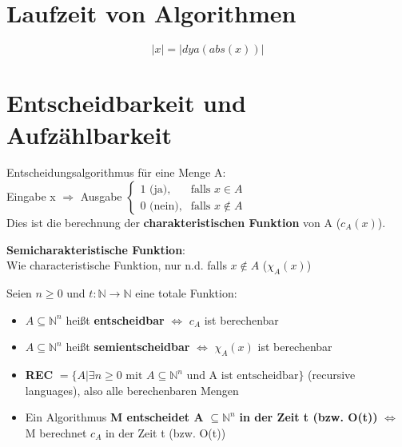 \documentclass[14pt]{article}
\begin{document}
\section{Laufzeit von Algorithmen}
\begin{definition}
    \[
        |x| = |dya(abs(x))|
    \]
\end{definition}

\section{Entscheidbarkeit und Aufzählbarkeit}
\begin{definition}[Entscheidungsalgorithmus]
    Entscheidungsalgorithmus für eine Menge A: \\
    \indent Eingabe x $\Rightarrow$ Ausgabe
    $ 
    \begin{cases}
        1 \text{ (ja),} & \text{falls } x \in A \\
        0 \text{ (nein),} & \text{falls } x \notin A
      \end{cases}   
    $ \\
    Dies ist die berechnung der \textbf{charakteristischen Funktion}
    von A ($c_A(x)$).
\end{definition}
\textbf{Semicharakteristische Funktion}: \\
Wie characteristische Funktion, nur n.d. falls $x \notin A$ ($\chi_A(x)$)
\begin{definition}[Entscheidbarkeit]
    Seien $n \geq 0$ und $t: \mathbb{N} \rightarrow \mathbb{N}$ eine 
    totale Funktion:
    \begin{itemize}
        \item $A \subseteq \mathbb{N}^n$ heißt \textbf{entscheidbar}
        $\Leftrightarrow$ $c_A$ ist berechenbar
        \item $A \subseteq \mathbb{N}^n$ heißt \textbf{semientscheidbar}
        $\Leftrightarrow$ $\chi_A(x)$ ist berechenbar
        \item \textbf{REC} $= \{ A | \exists n\geq 0 \text{ mit } A 
        \subseteq \mathbb{N}^n \text{ und A ist entscheidbar}\}$ 
        (recursive languages), also alle berechenbaren Mengen
        \item Ein Algorithmus \textbf{M entscheidet A} $\subseteq 
        \mathbb{N}^n$ \textbf{in der Zeit t (bzw. O(t))} $\Leftrightarrow$
        M berechnet $c_A$ in der Zeit t (bzw. O(t))
    \end{itemize}
\end{definition}
\end{document}
